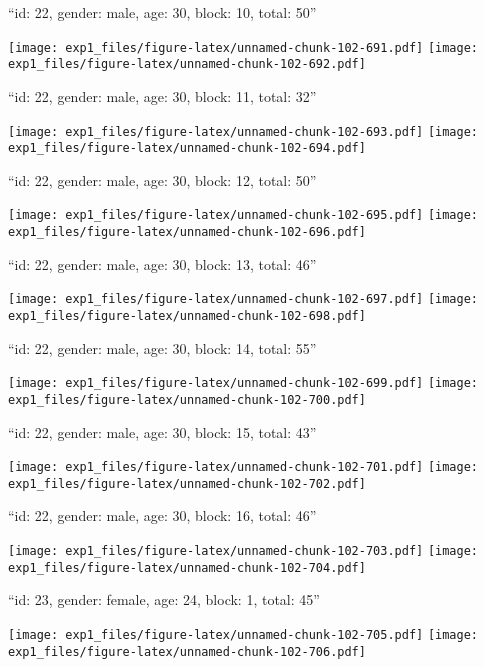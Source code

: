 \documentclass[11pt,,]{article}
\begin{document}
\newpage
[1] 

``id: 22, gender: male, age: 30, block: 10, total: 50''

\texttt{[image: exp1\_files/figure-latex/unnamed-chunk-102-691.pdf]}
\texttt{[image: exp1\_files/figure-latex/unnamed-chunk-102-692.pdf]}

\newpage
[1] 

``id: 22, gender: male, age: 30, block: 11, total: 32''

\texttt{[image: exp1\_files/figure-latex/unnamed-chunk-102-693.pdf]}
\texttt{[image: exp1\_files/figure-latex/unnamed-chunk-102-694.pdf]}

\newpage
[1] 

``id: 22, gender: male, age: 30, block: 12, total: 50''

\texttt{[image: exp1\_files/figure-latex/unnamed-chunk-102-695.pdf]}
\texttt{[image: exp1\_files/figure-latex/unnamed-chunk-102-696.pdf]}

\newpage
[1] 

``id: 22, gender: male, age: 30, block: 13, total: 46''

\texttt{[image: exp1\_files/figure-latex/unnamed-chunk-102-697.pdf]}
\texttt{[image: exp1\_files/figure-latex/unnamed-chunk-102-698.pdf]}

\newpage
[1] 

``id: 22, gender: male, age: 30, block: 14, total: 55''

\texttt{[image: exp1\_files/figure-latex/unnamed-chunk-102-699.pdf]}
\texttt{[image: exp1\_files/figure-latex/unnamed-chunk-102-700.pdf]}

\newpage
[1] 

``id: 22, gender: male, age: 30, block: 15, total: 43''

\texttt{[image: exp1\_files/figure-latex/unnamed-chunk-102-701.pdf]}
\texttt{[image: exp1\_files/figure-latex/unnamed-chunk-102-702.pdf]}

\newpage
[1] 

``id: 22, gender: male, age: 30, block: 16, total: 46''

\texttt{[image: exp1\_files/figure-latex/unnamed-chunk-102-703.pdf]}
\texttt{[image: exp1\_files/figure-latex/unnamed-chunk-102-704.pdf]}

\newpage
[1] 

``id: 23, gender: female, age: 24, block: 1, total: 45''

\texttt{[image: exp1\_files/figure-latex/unnamed-chunk-102-705.pdf]}
\texttt{[image: exp1\_files/figure-latex/unnamed-chunk-102-706.pdf]}
\end{document}
